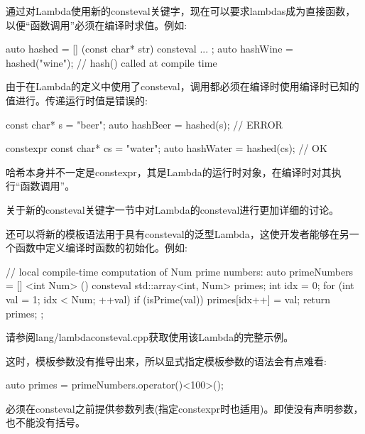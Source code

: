 通过对Lambda使用新的consteval关键字，现在可以要求lambdas成为直接函数，以便“函数调用”必须在编译时求值。例如:

\begin{cpp}
auto hashed = [] (const char* str) consteval {
					...
				};
auto hashWine = hashed("wine"); // hash() called at compile time
\end{cpp}

由于在Lambda的定义中使用了consteval，调用都必须在编译时使用编译时已知的值进行。传递运行时值是错误的:

\begin{cpp}
const char* s = "beer";
auto hashBeer = hashed(s); // ERROR

constexpr const char* cs = "water";
auto hashWater = hashed(cs); // OK
\end{cpp}

哈希本身并不一定是constexpr，其是Lambda的运行时对象，在编译时对其执行“函数调用”。

关于新的consteval关键字一节中对Lambda的consteval进行更加详细的讨论。

还可以将新的模板语法用于具有consteval的泛型Lambda，这使开发者能够在另一个函数中定义编译时函数的初始化。例如:

\begin{cpp}
// local compile-time computation of Num prime numbers:
auto primeNumbers = [] <int Num> () consteval {
					std::array<int, Num> primes;
					int idx = 0;
					for (int val = 1; idx < Num; ++val) {
						if (isPrime(val)) {
							primes[idx++] = val;
						}
					}
					return primes;
				};
\end{cpp}

请参阅lang/lambdaconsteval.cpp获取使用该Lambda的完整示例。

这时，模板参数没有推导出来，所以显式指定模板参数的语法会有点难看:

\begin{cpp}
auto primes = primeNumbers.operator()<100>();
\end{cpp}

必须在consteval之前提供参数列表(指定constexpr时也适用)。即使没有声明参数，也不能没有括号。




